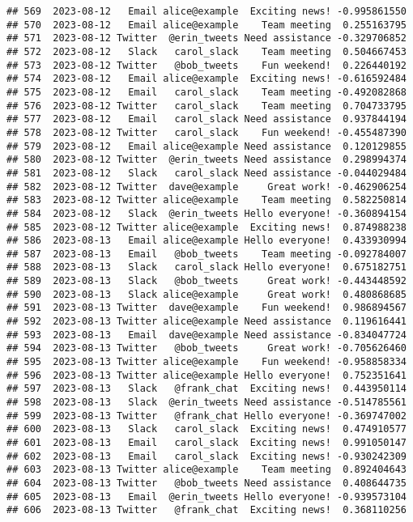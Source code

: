 \documentclass[
]{article}
\begin{document}
\begin{verbatim}
## 569  2023-08-12   Email alice@example  Exciting news! -0.995861550
## 570  2023-08-12   Email alice@example    Team meeting  0.255163795
## 571  2023-08-12 Twitter  @erin_tweets Need assistance -0.329706852
## 572  2023-08-12   Slack   carol_slack    Team meeting  0.504667453
## 573  2023-08-12 Twitter   @bob_tweets    Fun weekend!  0.226440192
## 574  2023-08-12   Email alice@example  Exciting news! -0.616592484
## 575  2023-08-12   Email   carol_slack    Team meeting -0.492082868
## 576  2023-08-12 Twitter   carol_slack    Team meeting  0.704733795
## 577  2023-08-12   Email   carol_slack Need assistance  0.937844194
## 578  2023-08-12 Twitter   carol_slack    Fun weekend! -0.455487390
## 579  2023-08-12   Email alice@example Need assistance  0.120129855
## 580  2023-08-12 Twitter  @erin_tweets Need assistance  0.298994374
## 581  2023-08-12   Slack   carol_slack Need assistance -0.044029484
## 582  2023-08-12 Twitter  dave@example     Great work! -0.462906254
## 583  2023-08-12 Twitter alice@example    Team meeting  0.582250814
## 584  2023-08-12   Slack  @erin_tweets Hello everyone! -0.360894154
## 585  2023-08-12 Twitter alice@example  Exciting news!  0.874988238
## 586  2023-08-13   Email alice@example Hello everyone!  0.433930994
## 587  2023-08-13   Email   @bob_tweets    Team meeting -0.092784007
## 588  2023-08-13   Slack   carol_slack Hello everyone!  0.675182751
## 589  2023-08-13   Slack   @bob_tweets     Great work! -0.443448592
## 590  2023-08-13   Slack alice@example     Great work!  0.480868685
## 591  2023-08-13 Twitter  dave@example    Fun weekend!  0.986894567
## 592  2023-08-13 Twitter alice@example Need assistance  0.119616441
## 593  2023-08-13   Email  dave@example Need assistance -0.834047724
## 594  2023-08-13 Twitter   @bob_tweets     Great work! -0.705626460
## 595  2023-08-13 Twitter alice@example    Fun weekend! -0.958858334
## 596  2023-08-13 Twitter alice@example Hello everyone!  0.752351641
## 597  2023-08-13   Slack   @frank_chat  Exciting news!  0.443950114
## 598  2023-08-13   Slack  @erin_tweets Need assistance -0.514785561
## 599  2023-08-13 Twitter   @frank_chat Hello everyone! -0.369747002
## 600  2023-08-13   Slack   carol_slack  Exciting news!  0.474910577
## 601  2023-08-13   Email   carol_slack  Exciting news!  0.991050147
## 602  2023-08-13   Email   carol_slack  Exciting news! -0.930242309
## 603  2023-08-13 Twitter alice@example    Team meeting  0.892404643
## 604  2023-08-13 Twitter   @bob_tweets Need assistance  0.408644735
## 605  2023-08-13   Email  @erin_tweets Hello everyone! -0.939573104
## 606  2023-08-13 Twitter   @frank_chat  Exciting news!  0.368110256

\end{verbatim}
\end{document}
